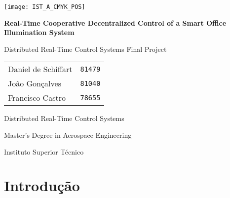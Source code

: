 \documentclass{article}
\begin{document}
\begin{titlepage}

\begin{center}
	\vspace*{0.1\textheight}
	\texttt{[image: IST\_A\_CMYK\_POS]}
	
	\vspace*{0.1\textheight}
	{\huge\bfseries Real-Time Cooperative Decentralized Control of a Smart Office Illumination System}
	
	\vspace*{0.03\textheight}
	{\Large Distributed Real-Time Control Systems Final Project}
	
	\vspace*{43.5mm}
	{\Large \begin{tabular}{l r} Daniel de Schiffart & \texttt{81479} \\ João Gonçalves & \texttt{81040} \\ Francisco Castro & \texttt{78655}\end{tabular}}
	
	\vspace{\fill}
	{\large Distributed Real-Time Control Systems}
	
	\vspace*{0.01\textheight}
	{\Large Master's Degree in Aerospace Engineering}
	
	\vspace*{0.01\textheight}
	{\large Instituto Superior Técnico}
\end{center}

\end{titlepage}
\setcounter{page}{1}

{\hypersetup{linkcolor = black} \tableofcontents}
\pagebreak

\section{Introdução}
\end{document}
